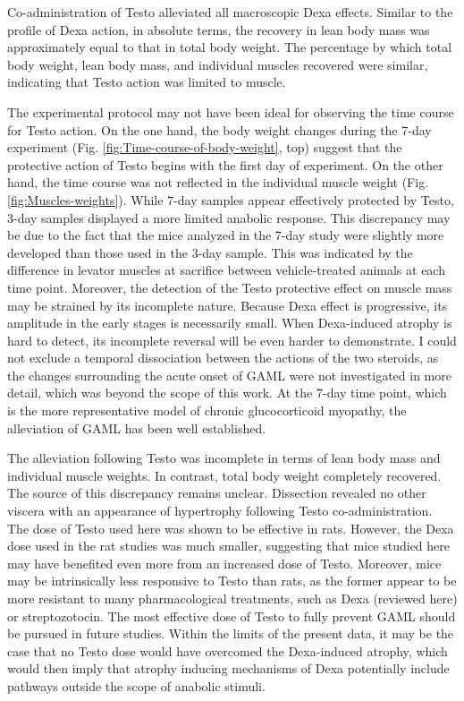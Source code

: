 \documentclass[12pt,english]{report}\usepackage[]{graphicx}\usepackage[]{color}
\begin{document}
Co-administration of Testo alleviated all macroscopic Dexa effects.
Similar to the profile of Dexa action, in absolute terms, the recovery
in lean body mass was approximately equal to that in total body weight.
The percentage by which total body weight, lean body mass, and individual
muscles recovered were similar, indicating that Testo action was limited
to muscle.

The experimental protocol may not have been ideal for observing the
time course for Testo action. On the one hand, the body weight changes
during the 7-day experiment (Fig. \ref{fig:Time-course-of-body-weight},
top) suggest that the protective action of Testo begins with the first
day of experiment. On the other hand, the time course was not reflected
in the individual muscle weight (Fig. \ref{fig:Muscles-weights}).
While 7-day samples appear effectively protected by Testo, 3-day samples
displayed a more limited anabolic response. This discrepancy may be
due to the fact that the mice analyzed in the 7-day study were slightly
more developed than those used in the 3-day sample. This was indicated
by the difference in levator muscles at sacrifice between vehicle-treated
animals at each time point. Moreover, the detection of the Testo protective
effect on muscle mass may be strained by its incomplete nature. Because
Dexa effect is progressive, its amplitude in the early stages is necessarily
small. When Dexa-induced atrophy is hard to detect, its incomplete
reversal will be even harder to demonstrate. I could not exclude a
temporal dissociation between the actions of the two steroids, as
the changes surrounding the acute onset of GAML were not investigated
in more detail, which was beyond the scope of this work. At the 7-day
time point, which is the more representative model of chronic glucocorticoid
myopathy, the alleviation of GAML has been well established.

The alleviation following Testo was incomplete in terms of lean body
mass and individual muscle weights. In contrast, total body weight
completely recovered. The source of this discrepancy remains unclear.
Dissection revealed no other viscera with an appearance of hypertrophy
following Testo co-administration. The dose of Testo used here was
shown to be effective in rats. However, the Dexa dose used in the
rat studies was much smaller, suggesting that mice studied here may
have benefited even more from an increased dose of Testo. Moreover,
mice may be intrinsically less responsive to Testo than rats, as the
former appear to be more resistant to many pharmacological treatments,
such as Dexa (reviewed here) or streptozotocin\citep{tay2005can}.
The most effective dose of Testo to fully prevent GAML should be pursued
in future studies. Within the limits of the present data, it may be
the case that no Testo dose would have overcomed the Dexa-induced
atrophy, which would then imply that atrophy inducing mechanisms of
Dexa potentially include pathways outside the scope of anabolic stimuli.
\end{document}
